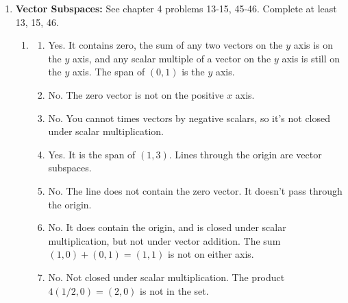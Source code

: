 {\begin{multicols}{2}
\begin{enumerate}
\begin{enumerate}
	
	\item
\begin{enumerate}
	\item 
	Distribution across scalar multiplication fails:  
	$(j+k)(a,b) = (a,(j+k)b) = (a,jb+kb)$ whereas $j(a,b)+k(a,b) = (a,jb)+(a,kb) = (2a,(j+k)b)$ 
	(notice that $a$ is doubled if we multiply first before adding).
	\item  
	Vector addition is not commutative. $(a,b)+(c,d) = (a+c,b)$ while $(c,d)+(a,b) = (a+c,d)$ 
	(the second components are not the same, $b\neq d$.
\end{enumerate}


	\item 
\begin{enumerate}
	\item  Distribution across scalar multiplication fails.
	(M2) $(j+k)(a,b) = ((j+k)^2a,(j+k)b)$ whereas $j(a,b)+k(a,b) = (j^2a,jb)+(k^2a,b) = ((j^2+k^2)a,(j+k)b)$, and $j^2+k^2\neq (j+k)^2$.
	\item  
	Vector addition is not commutative. $(a,b)+(c,d) = (a,d)$ while $(c,d)+(a,b) = (c,b)$.
	
\end{enumerate}


\end{enumerate}



\item \textbf{Vector Subspaces:} 
See chapter 4 problems 13-15, 45-46. Complete at least 13, 15, 46.

\begin{enumerate}
	\item 
		\begin{enumerate}
			\item Yes.  It contains zero, the sum of any two vectors on the $y$ axis is on the $y$ axis, and any scalar multiple of a vector on the $y$ axis is still on the $y$ axis.  The span of $(0,1)$ is the $y$ axis.
			\item No. The zero vector is not on the positive $x$ axis.
			\item No. You cannot times vectors by negative scalars, so it's not closed under scalar multiplication.
			\item Yes. It is the span of $(1,3)$. Lines through the origin are vector subspaces.
			\item No. The line does not contain the zero vector.  It doesn't pass through the origin.
			\item No. It does contain the origin, and is closed under scalar multiplication, but not under vector addition.  The sum $(1,0)+(0,1)=(1,1)$ is not on either axis.
			\item No. Not closed under scalar multiplication. The product $4(1/2,0) = (2,0)$ is not in the set.
		\end{enumerate}



\end{enumerate}
\end{enumerate}
\end{multicols}}
